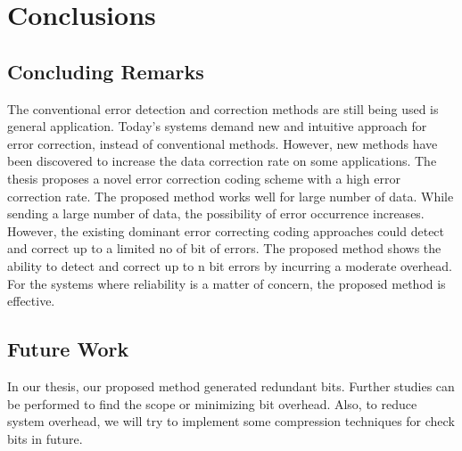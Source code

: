 \documentclass[12pt,a4paper]{report}
\begin{document}
\chapter{Conclusions}
\section{Concluding Remarks}
The conventional error detection and correction methods are still being used is general
application. Today's systems demand new and intuitive approach for error correction, instead of
conventional methods. However, new methods have been discovered to increase the data
correction rate on some applications.
The thesis proposes a novel error correction coding scheme with a high error correction rate. The
proposed method works well for large number of data. While sending a large number of data, the
possibility of error occurrence increases. However, the existing dominant error correcting coding
approaches could detect and correct up to a limited no of bit of errors. The proposed method
shows the ability to detect and correct up to n bit errors by incurring a moderate overhead. For the
systems where reliability is a matter of concern, the proposed method is effective.
\section{Future Work}
In our thesis, our proposed method generated redundant bits. Further studies can be performed to find the scope or minimizing bit overhead. Also, to reduce system overhead, we will try to implement some compression techniques for check bits in future.
\end{document}
